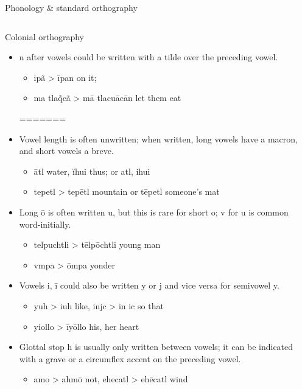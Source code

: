 \documentclass[12pt]{beamer}
\newcommand{\nah}[1]{\textcolor{nahgrn}{#1}}
\newcommand{\trs}[1]{\textcolor{nahblu}{#1}}
\begin{document}
\begin{frame}
\begin{columns}[t]
\begin{column}{.22\linewidth}
\begin{block}{Phonology \& standard orthography}
\begin{threeparttable}
\begin{tablenotes}
\begin{frame}
\begin{columns}[t]
\begin{column}{.23\linewidth}
\begin{block}{Colonial orthography}
\begin{itemize}
\begin{itemize}
          \end{itemize}
        \item \nah{n} after vowels could be written with a tilde over the preceding vowel.
          \begin{itemize}
          \item \nah{ipã} > \nah{īpan} \trs{on it}; 
          \item \nah{ma tla\~qcã} > \nah{mā tlacuācān} \trs{let them eat}
          \end{itemize}
=======
          \item Vowel length is often unwritten; when written, long vowels have a macron, and short vowels a breve.
                \begin{itemize}
                  \item  \nah{ātl} \trs{water}, \nah{ĭhui} \trs{thus}; or \nah{atl}, \nah{ihui}
                  \item  \nah{tepetl} > \nah{tepētl} \trs{mountain} or \nah{tēpetl} \trs{someone's mat}
                \end{itemize}
          \item  Long \nah{ō} is often written \nah{u}, but this is rare for short \nah{o}; \nah{v} for \nah{u} is common word-initially.
                \begin{itemize}
                  \item \nah{telpuchtli} > \nah{tēlpōchtli} \trs{young man}
                  \item \nah{vmpa} > \nah{ōmpa} \trs{yonder}
                \end{itemize}
          \item Vowels \nah{i}, \nah{ī} could also be written \nah{y} or \nah{j} and vice versa for semivowel \nah{y}.
                \begin{itemize}
                  \item \nah{yuh} > \nah{iuh} \trs{like}, \nah{injc} > \nah{in ic} \trs{so that}
                  \item \nah{yiollo} > \nah{īyōllo} \trs{his, her heart}
                \end{itemize}
          \item Glottal stop \nah{h} is usually only written between vowels; it can be indicated with  a grave or a circumflex accent on the preceding vowel.
                \begin{itemize}
                  \item \nah{amo} > \nah{ahmō} \trs{not}, \nah{ehecatl} > \nah{ehēcatl} \trs{wind}

\end{itemize}
\end{itemize}
\end{block}
\end{column}
\end{columns}
\end{frame}
\end{tablenotes}
\end{threeparttable}
\end{block}
\end{column}
\end{columns}
\end{frame}
\end{document}
